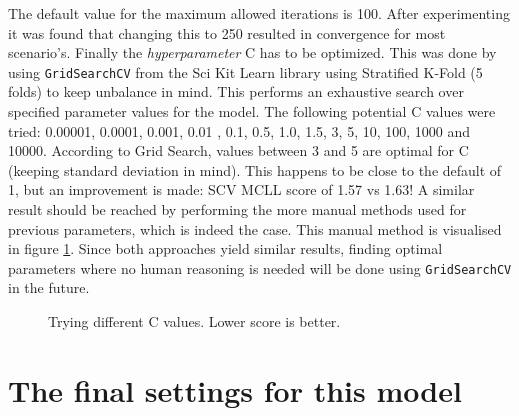 The default value for the maximum allowed iterations is 100.
After experimenting it was found that changing this to 250 resulted in convergence for most scenario's.
Finally the \textit{hyperparameter} C has to be optimized.
This was done by using \texttt{GridSearchCV} from the Sci Kit Learn library using Stratified K-Fold (5 folds) to keep unbalance in mind.
This performs an exhaustive search over specified parameter values for the model.
The following potential C values were tried: 0.00001, 0.0001, 0.001, 0.01 , 0.1, 0.5, 1.0, 1.5, 3, 5, 10, 100, 1000 and 10000.
According to Grid Search, values between 3 and 5 are optimal for C (keeping standard deviation in mind).
This happens to be close to the default of 1, but an improvement is made: SCV MCLL score of 1.57 vs 1.63!
A similar result should be reached by performing the more manual methods used for previous parameters, which is indeed the case.
This manual method is visualised in figure \ref{fig:2-LBM-model_manual_c}.
Since both approaches yield similar results, finding optimal parameters where no human reasoning is needed will be done using \texttt{GridSearchCV} in the future.


\begin{figure}[H]
    \centering
    \captionsetup{width=0.85\linewidth}
    \captionsetup{justification=centering}
    \caption{Trying different C values. Lower score is better.}
    \label{fig:2-LBM-model_manual_c}
\end{figure}

\section{The final settings for this model}
\label{section:LBM_optimal}

